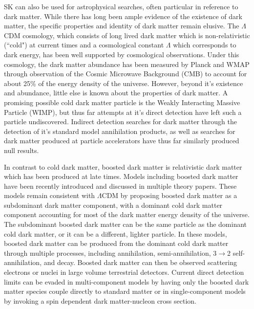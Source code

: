 \documentclass[12pt,oneside,openright]{article}
\begin{document}
SK can also be used for astrophysical searches, often particular in reference to dark matter.  While there has long been ample evidence of the existence of dark matter, the specific properties and identity of dark matter remain elusive.  The $\Lambda$CDM cosmology, which consists of long lived dark matter which is non-relativistic (``cold") at current times and a cosmological constant $\Lambda$ which corresponds to dark energy, has been well supported by cosmological observations.  Under this cosmology, the dark matter abundance has been measured by Planck and WMAP through observation of the Cosmic Microwave Background (CMB) to account for about 25\% of the energy density of the universe.  However, beyond it's existence and abundance, little else is known about the properties of dark matter.  A promising possible cold dark matter particle is the Weakly Interacting Massive Particle (WIMP), but thus far attempts at it's direct detection have left such a particle undiscovered. Indirect detection searches for dark matter through the detection of it's standard model annihilation products, as well as searches for dark matter produced at particle accelerators have thus far similarly produced null results.\par   
In contrast to cold dark matter, boosted dark matter is relativistic dark matter which has been produced at late times.  Models including boosted dark matter have been recently introduced and discussed in multiple theory papers.  These models remain consistent with $\Lambda$CDM by proposing boosted dark matter as a subdominant dark matter component, with a dominant cold dark matter component accounting for most of the dark matter energy density of the universe.  The subdominant boosted dark matter can be the same particle as the dominant cold dark matter, or it can be a different, lighter particle.  In these models, boosted dark matter can be produced from the dominant cold dark matter through multiple processes, including annihilation, semi-annihilation, 3$\rightarrow$2 self-annihilation, and decay.  Boosted dark matter can then be observed scattering electrons or nuclei in large volume terrestrial detectors.  Current direct detection limits can be evaded in multi-component models by having only the boosted dark matter species couple directly to standard matter or in single-component models by invoking a spin dependent dark matter-nucleon cross section. \par
\end{document}
